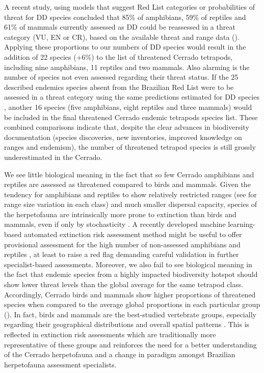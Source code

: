 \documentclass[12pt,openright,oneside,a4paper,english]{abntex2}
\begin{document}
A recent study, using models that suggest Red List categories or probabilities of threat for DD species concluded that 85\% of amphibians, 59\% of reptiles and 61\% of mammals currently assessed as DD could be reassessed in a threat category (VU, EN or CR), based on the available threat and range data (\citealp[see][]{Borgelt2022}). Applying these proportions to our numbers of DD species would result in the addition of  22 species (+6\%) to the list of threatened Cerrado tetrapods, including nine amphibians, 11 reptiles and two mammals. Also alarming is the number of species not even assessed regarding their threat status. If the 25 described endemics species absent from the Brazilian Red List were to be assessed in a threat category using the same predictions estimated for DD species \citep{Borgelt2022}, another 16 species (five amphibians, eight reptiles and three mammals) would be included in the final threatened Cerrado endemic tetrapods species list. These combined comparisons indicate that, despite the clear advances in biodiversity documentation (species discoveries, new inventories, improved knowledge on ranges and endemism), the number of threatened tetrapod species is still grossly underestimated in the Cerrado.

We see little biological meaning in the fact that so few Cerrado amphibians and reptiles are assessed as threatened compared to birds and mammals. Given the tendency for amphibians and reptiles to show relatively restricted ranges (see  for range size variation in each class) and much smaller dispersal capacity, species of the herpetofauna are intrinsically more prone to extinction than birds and mammals, even if only by stochasticity \citep{Gaston1998, Meiri2018}. A recently developed machine learning-based automated extinction risk assessment method might be useful to offer provisional assessment for the high number of non-assessed amphibians and reptiles \citep{Caetano2022}, at least to raise a red flag demanding careful validation in further specialist-based assessments. Moreover, we also fail to see biological meaning in the fact that endemic species from a highly impacted biodiversity hotspot should show lower threat levels than the global average for the same tetrapod class. Accordingly, Cerrado birds and mammals show higher proportions of threatened species when compared to the average global proportions in each particular group (\citealp[see][]{Cox2022}). In fact, birds and mammals are the best-studied vertebrate groups, especially regarding their geographical distributions and overall spatial patterns \citep{Brown1995}. This is reflected in extinction risk assessments which are traditionally more representative of these groups \citep{Cox2022} and reinforces the need for a better understanding of the Cerrado herpetofauna and a change in paradigm amongst Brazilian herpetofauna assessment specialists. 
\end{document}
